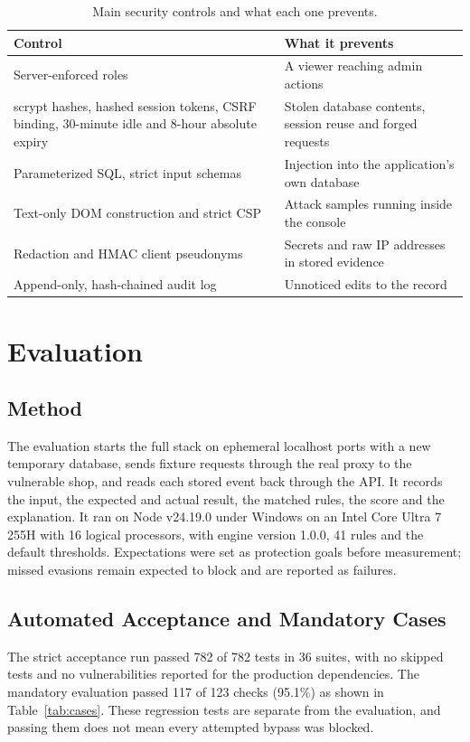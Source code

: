 \documentclass{FastFyp}
\begin{document}
\begin{table}[!h]
\centering
\caption{Main security controls and what each one prevents.}
{\small\singlespacing\renewcommand{\arraystretch}{1.3}
\begin{tabular}{|p{6.0cm}|p{7.5cm}|}
\hline
\textbf{Control} & \textbf{What it prevents} \\
\hline
Server-enforced roles & A viewer reaching admin actions \\
\hline
scrypt hashes, hashed session tokens, CSRF binding, 30-minute idle and 8-hour absolute expiry & Stolen database contents, session reuse and forged requests \\
\hline
Parameterized SQL, strict input schemas & Injection into the application's own database \\
\hline
Text-only DOM construction and strict CSP & Attack samples running inside the console \\
\hline
Redaction and HMAC client pseudonyms & Secrets and raw IP addresses in stored evidence \\
\hline
Append-only, hash-chained audit log & Unnoticed edits to the record \\
\hline
\end{tabular}}
\label{tab:controls}
\end{table}

\chapter{Evaluation}
\section{Method}
The evaluation starts the full stack on ephemeral localhost ports with a new temporary database, sends fixture requests through the real proxy to the vulnerable shop, and reads each stored event back through the API. It records the input, the expected and actual result, the matched rules, the score and the explanation. It ran on Node v24.19.0 under Windows on an Intel Core Ultra 7 255H with 16 logical processors, with engine version 1.0.0, 41 rules and the default thresholds. Expectations were set as protection goals before measurement; missed evasions remain expected to block and are reported as failures.

\section{Automated Acceptance and Mandatory Cases}
The strict acceptance run passed 782 of 782 tests in 36 suites, with no skipped tests and no vulnerabilities reported for the production dependencies. The mandatory evaluation passed 117 of 123 checks (95.1\%) as shown in Table~\ref{tab:cases}. These regression tests are separate from the evaluation, and passing them does not mean every attempted bypass was blocked.
\end{document}
